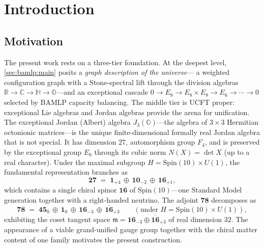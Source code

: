\section{Introduction}
\label{sec:intro:main}

\subsection{Motivation}
\label{sec:intro:motivation}

The present work rests on a three-tier foundation. At the deepest level,
\autoref{sec:bamlp:main} posits a \emph{graph description of the universe}---
a weighted configuration graph with a Stone-spectral lift through the division
algebras $\mathbb{R}\to\mathbb{C}\to\mathbb{H}\to\mathbb{O}$---and an
exceptional cascade $0\to E_8\to E_8\times E_8\to E_6\to\cdots\to 0$ selected
by BAMLP capacity balancing. The middle tier is UCFT proper: exceptional Lie
algebras and Jordan algebras provide the arena for unification. The exceptional Jordan (Albert) algebra
$J_{3}(\mathbb{O})$---the algebra of $3\times 3$ Hermitian octonionic
matrices---is the unique finite-dimensional formally real Jordan algebra that is
not special. It has dimension $27$, automorphism group $F_4$, and is preserved
by the exceptional group $E_6$ through its cubic norm $N(X)=\det X$ (up to a
real character). Under the maximal subgroup $H=\mathrm{Spin}(10)\times U(1)$,
the fundamental representation branches as
\begin{equation}
  \mathbf{27} \;=\; \mathbf{1}_{+4}\,\oplus\,\mathbf{10}_{-2}\,\oplus\,\mathbf{16}_{+1},
  \label{eq:intro:27branch}
\end{equation}
which contains a single chiral spinor $\mathbf{16}$ of $\mathrm{Spin}(10)$---one
Standard Model generation together with a right-handed neutrino. The adjoint
$\mathbf{78}$ decomposes as
\begin{equation}
  \mathbf{78} \;=\; \mathbf{45}_{0}\,\oplus\,\mathbf{1}_{0}\,\oplus\,
  \mathbf{16}_{-3}\,\oplus\,\overline{\mathbf{16}}_{+3}
  \qquad (\text{under } H=\mathrm{Spin}(10)\times U(1)),
  \label{eq:intro:78branch}
\end{equation}
exhibiting the coset tangent space $\mathfrak{m}=\mathbf{16}_{-3}\oplus\overline{\mathbf{16}}_{+3}$
of real dimension $32$. The appearance of a viable grand-unified gauge group
together with the chiral matter content of one family motivates the present
construction.

